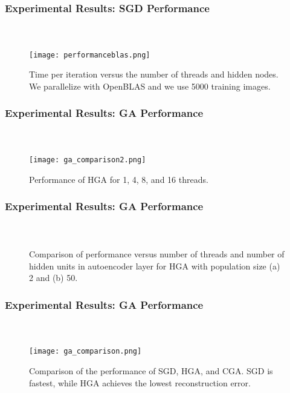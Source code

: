 \begin{frame}[t]
	\frametitle{Experimental Results: SGD Performance}
	\framesubtitle{~~}  %

	\begin{figure}[h]
		\centering
		\texttt{[image: performanceblas.png]}
		\caption{Time per iteration versus the number of threads and hidden nodes. We parallelize with OpenBLAS and we use 5000 training images.}
		\label{fig:performanceblas}
	\end{figure}

\end{frame}


\begin{frame}[t]
	\frametitle{Experimental Results: GA Performance}
	\framesubtitle{~~}  %

	\begin{figure}[h] \centering
		\texttt{[image: ga\_comparison2.png]}
		\caption{Performance of HGA for 1, 4, 8, and 16 threads.}
		\label{fig:ga_comparison2}
	\end{figure}


\end{frame}


\begin{frame}[t]
	\frametitle{Experimental Results: GA Performance}
	\framesubtitle{~~}  %

\begin{figure}[H]
  \centering
  \caption{Comparison of performance versus number of threads and number of hidden units in autoencoder layer for HGA with population size (a) 2 and (b) 50.}
  \label{fig:ga_comparison3}
\end{figure}


\end{frame}


\begin{frame}[t]
	\frametitle{Experimental Results: GA Performance}
	\framesubtitle{~~}  %

\begin{figure}[h] \centering
  \texttt{[image: ga\_comparison.png]}
  \caption{Comparison of the performance of SGD, HGA, and CGA. SGD is fastest, while HGA achieves the lowest reconstruction error.}
  \label{fig:ga_comparison}
\end{figure}

\end{frame}
